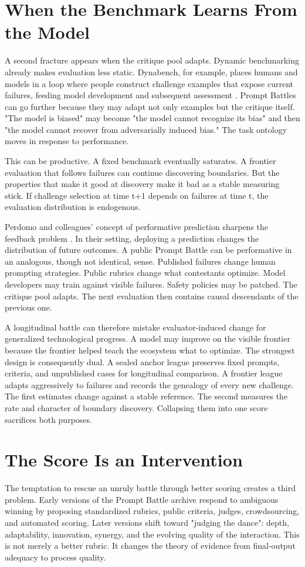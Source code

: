 \documentclass[11pt]{article}
\begin{document}
\section{When the Benchmark Learns From the Model}
A second fracture appears when the critique pool adapts. Dynamic benchmarking already makes evaluation less static. Dynabench, for example, places humans and models in a loop where people construct challenge examples that expose current failures, feeding model development and subsequent assessment \cite{kiela2021dynabench}. Prompt Battles can go further because they may adapt not only examples but the critique itself. "The model is biased" may become "the model cannot recognize its bias" and then "the model cannot recover from adversarially induced bias." The task ontology moves in response to performance.

This can be productive. A fixed benchmark eventually saturates. A frontier evaluation that follows failures can continue discovering boundaries. But the properties that make it good at discovery make it bad as a stable measuring stick. If challenge selection at time t+1 depends on failures at time t, the evaluation distribution is endogenous.

Perdomo and colleagues' concept of performative prediction sharpens the feedback problem \cite{perdomo2020performative}. In their setting, deploying a prediction changes the distribution of future outcomes. A public Prompt Battle can be performative in an analogous, though not identical, sense. Published failures change human prompting strategies. Public rubrics change what contestants optimize. Model developers may train against visible failures. Safety policies may be patched. The critique pool adapts. The next evaluation then contains causal descendants of the previous one.

A longitudinal battle can therefore mistake evaluator-induced change for generalized technological progress. A model may improve on the visible frontier because the frontier helped teach the ecosystem what to optimize. The strongest design is consequently dual. A sealed anchor league preserves fixed prompts, criteria, and unpublished cases for longitudinal comparison. A frontier league adapts aggressively to failures and records the genealogy of every new challenge. The first estimates change against a stable reference. The second measures the rate and character of boundary discovery. Collapsing them into one score sacrifices both purposes.

\section{The Score Is an Intervention}
The temptation to rescue an unruly battle through better scoring creates a third problem. Early versions of the Prompt Battle archive respond to ambiguous winning by proposing standardized rubrics, public criteria, judges, crowdsourcing, and automated scoring. Later versions shift toward "judging the dance": depth, adaptability, innovation, synergy, and the evolving quality of the interaction. This is not merely a better rubric. It changes the theory of evidence from final-output adequacy to process quality.
\end{document}

